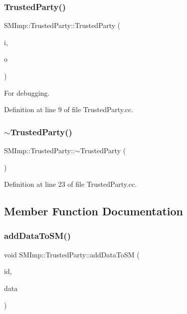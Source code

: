 \subsubsection{\texorpdfstring{Trusted\+Party()}{TrustedParty()}\hspace{0.1cm}{\footnotesize\ttfamily [2/2]}}
{\footnotesize\ttfamily S\+M\+Imp\+::\+Trusted\+Party\+::\+Trusted\+Party (\begin{DoxyParamCaption}\item[{Integer}]{i,  }\item[{\hyperlink{classTTPAdapter}{T\+T\+P\+Adapter} $\ast$}]{o }\end{DoxyParamCaption})}

For debugging. 

Definition at line 9 of file Trusted\+Party.\+cc.

\mbox{\label{classSMImp_1_1TrustedParty_a93dd8343a752486f8a47691b429ad6a3}} 
\subsubsection{\texorpdfstring{$\sim$\+Trusted\+Party()}{~TrustedParty()}}
{\footnotesize\ttfamily S\+M\+Imp\+::\+Trusted\+Party\+::$\sim$\+Trusted\+Party (\begin{DoxyParamCaption}{ }\end{DoxyParamCaption})\hspace{0.3cm}{\ttfamily [virtual]}}



Definition at line 23 of file Trusted\+Party.\+cc.



\subsection{Member Function Documentation}
\mbox{\label{classSMImp_1_1TrustedParty_aa8343369b112c07a86ab42a9ee64228b}} 
\subsubsection{\texorpdfstring{add\+Data\+To\+S\+M()}{addDataToSM()}}
{\footnotesize\ttfamily void S\+M\+Imp\+::\+Trusted\+Party\+::add\+Data\+To\+SM (\begin{DoxyParamCaption}\item[{int}]{id,  }\item[{Integer $\ast$}]{data }\end{DoxyParamCaption})}


